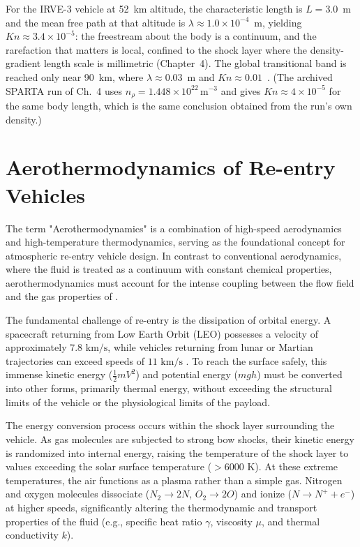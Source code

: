 \noindent For the IRVE-3 vehicle at 52~km altitude, the characteristic length is $L = 3.0$~m and the mean free path at that altitude is $\lambda \approx 1.0\times10^{-4}$~m, yielding $Kn \approx 3.4\times10^{-5}$: the freestream about the body is a continuum, and the rarefaction that matters is local, confined to the shock layer where the density-gradient length scale is millimetric (Chapter~4). The global transitional band is reached only near 90~km, where $\lambda \approx 0.03$~m and $Kn \approx 0.01$~\cite{bird1994molecular}. (The archived SPARTA run of Ch.~4 uses $n_{\rho}=1.448\times10^{22}$\,m$^{-3}$ and gives $Kn\approx4\times10^{-5}$ for the same body length, which is the same conclusion obtained from the run's own density.)

\section{Aerothermodynamics of Re-entry Vehicles}
The term "Aerothermodynamics" is a combination of high-speed aerodynamics and high-temperature thermodynamics, serving as the foundational concept for atmospheric re-entry vehicle design. In contrast to conventional aerodynamics, where the fluid is treated as a continuum with constant chemical properties, aerothermodynamics must account for the intense coupling between the flow field and the gas properties of \cite{AndersonHypersonic}.
\par
The fundamental challenge of re-entry is the dissipation of orbital energy. A spacecraft returning from Low Earth Orbit (LEO) possesses a velocity of approximately $7.8 \text{ km/s}$, while vehicles returning from lunar or Martian trajectories can exceed speeds of $11 \text{ km/s}$ \cite{AndersonHypersonic}. To reach the surface safely, this immense kinetic energy ($\frac{1}{2}mV^2$) and potential energy ($mgh$) must be converted into other forms, primarily thermal energy, without exceeding the structural limits of the vehicle or the physiological limits of the payload.
\par
The energy conversion process occurs within the shock layer surrounding the vehicle. As gas molecules are subjected to strong bow shocks, their kinetic energy is randomized into internal energy, raising the temperature of the shock layer to values exceeding the solar surface temperature ($> 6000 \text{ K}$). At these extreme temperatures, the air functions as a plasma rather than a simple gas. Nitrogen and oxygen molecules dissociate ($N_2 \rightarrow 2N$, $O_2 \rightarrow 2O$) and ionize ($N \rightarrow N^+ + e^-$) at higher speeds, significantly altering the thermodynamic and transport properties of the fluid (e.g., specific heat ratio $\gamma$, viscosity $\mu$, and thermal conductivity $k$).
